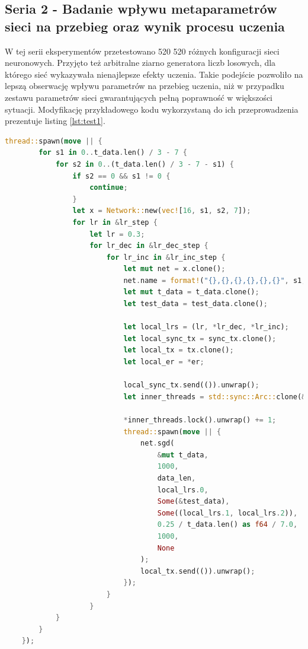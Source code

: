 \documentclass[12pt,twoside]{article}
\begin{document}
\clearpage
\subsection{Seria 2 - Badanie wpływu metaparametrów sieci na przebieg oraz wynik procesu uczenia}
W tej serii eksperymentów przetestowano 520 520 różnych konfiguracji sieci neuronowych.
Przyjęto też arbitralne ziarno generatora liczb losowych, dla którego sieć wykazywała nienajlepsze efekty uczenia.
Takie podejście pozwoliło na lepszą obserwację wpływu parametrów na przebieg uczenia, niż w przypadku zestawu parametrów sieci gwarantujących pełną poprawność w większości sytuacji.
Modyfikację przykładowego kodu wykorzystaną do ich przeprowadzenia prezentuje listing \ref{lst:test1}.

\begin{lstlisting}[language=Rust,caption=Modyfikacja kodu tworzącego instancje sieci na potrzeby eksperymentu,label={lst:test1}]
    thread::spawn(move || {
        for s1 in 0..t_data.len() / 3 - 7 {
            for s2 in 0..(t_data.len() / 3 - 7 - s1) {
                if s2 == 0 && s1 != 0 {
                    continue;
                }
                let x = Network::new(vec![16, s1, s2, 7]);
                for lr in &lr_step {
                    let lr = 0.3;
                    for lr_dec in &lr_dec_step {
                        for lr_inc in &lr_inc_step {
                            let mut net = x.clone();
                            net.name = format!("{},{},{},{},{},{}", s1, s2, lr, lr_dec, lr_inc, er);
                            let mut t_data = t_data.clone();
                            let test_data = test_data.clone();

                            let local_lrs = (lr, *lr_dec, *lr_inc);
                            let local_sync_tx = sync_tx.clone();
                            let local_tx = tx.clone();
                            let local_er = *er;

                            local_sync_tx.send(()).unwrap();
                            let inner_threads = std::sync::Arc::clone(&tmp_threads);

                            *inner_threads.lock().unwrap() += 1;
                            thread::spawn(move || {
                                net.sgd(
                                    &mut t_data,
                                    1000,
                                    data_len,
                                    local_lrs.0,
                                    Some(&test_data),
                                    Some((local_lrs.1, local_lrs.2)),
                                    0.25 / t_data.len() as f64 / 7.0,
                                    1000,
                                    None
                                );
                                local_tx.send(()).unwrap();
                            });
                        }
                    }
            }
        }
    });
\end{lstlisting}
\end{document}
